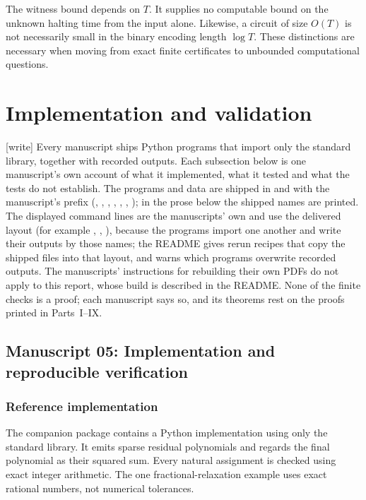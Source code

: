 \documentclass[11pt,a4paper]{article}
\theoremstyle{definition}
\theoremstyle{remark}
\newcommand{\wtag}{\textup{[write]}}%
\begin{document}
The witness bound depends on $T$. It supplies no computable bound on the unknown halting time from the input alone. Likewise, a circuit of size $O(T)$ is not necessarily small in the binary encoding length $\log T$. These distinctions are necessary when moving from exact finite certificates to unbounded computational questions.


\section{Implementation and validation}\label{cdc:sec:validation}
\wtag{} Every manuscript ships Python programs that import only the standard library, together with recorded outputs. Each subsection below is one manuscript's own account of what it implemented, what it tested and what the tests do not establish. The programs and data are shipped in  and  with the manuscript's prefix (, , , , , , ); in the prose below the shipped names are printed. The displayed command lines are the manuscripts' own and use the delivered layout (for example , , ), because the programs import one another and write their outputs by those names; the README gives rerun recipes that copy the shipped files into that layout, and warns which programs overwrite recorded outputs. The manuscripts' instructions for rebuilding their own PDFs do not apply to this report, whose build is described in the README. None of the finite checks is a proof; each manuscript says so, and its theorems rest on the proofs printed in Parts~I--IX.

\subsection{Manuscript 05: Implementation and reproducible verification}
\label{cdc:sec:implementation}
\subsubsection{Reference implementation}
The companion package contains a Python implementation using only the standard library. It emits sparse residual polynomials and regards the final polynomial as their squared sum. Every natural assignment is checked using exact integer arithmetic. The one fractional-relaxation example uses exact rational numbers, not numerical tolerances.
\end{document}
